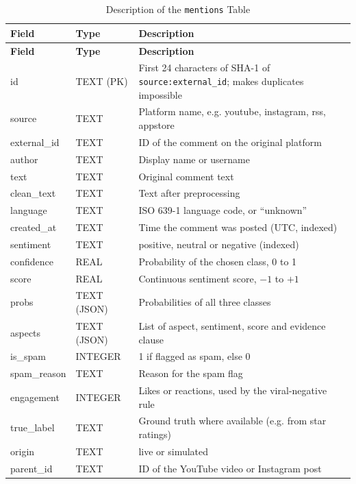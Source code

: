 \documentclass[12pt,a4paper]{report}
\begin{document}
\begin{longtable}{|P{2.8cm}|P{2.4cm}|P{8.6cm}|}
\caption{Description of the \texttt{mentions} Table}
\label{tab:mentions}\\
\hline
\textbf{Field} & \textbf{Type} & \textbf{Description} \\
\hline
\endfirsthead
\hline
\textbf{Field} & \textbf{Type} & \textbf{Description} \\
\hline
\endhead
id & TEXT (PK) & First 24 characters of SHA-1 of \texttt{source:external\_id}; makes duplicates impossible \\ \hline
source & TEXT & Platform name, e.g. youtube, instagram, rss, appstore \\ \hline
external\_id & TEXT & ID of the comment on the original platform \\ \hline
author & TEXT & Display name or username \\ \hline
text & TEXT & Original comment text \\ \hline
clean\_text & TEXT & Text after preprocessing \\ \hline
language & TEXT & ISO 639-1 language code, or ``unknown'' \\ \hline
created\_at & TEXT & Time the comment was posted (UTC, indexed) \\ \hline
sentiment & TEXT & positive, neutral or negative (indexed) \\ \hline
confidence & REAL & Probability of the chosen class, 0 to 1 \\ \hline
score & REAL & Continuous sentiment score, $-1$ to $+1$ \\ \hline
probs & TEXT (JSON) & Probabilities of all three classes \\ \hline
aspects & TEXT (JSON) & List of aspect, sentiment, score and evidence clause \\ \hline
is\_spam & INTEGER & 1 if flagged as spam, else 0 \\ \hline
spam\_reason & TEXT & Reason for the spam flag \\ \hline
engagement & INTEGER & Likes or reactions, used by the viral-negative rule \\ \hline
true\_label & TEXT & Ground truth where available (e.g. from star ratings) \\ \hline
origin & TEXT & live or simulated \\ \hline
parent\_id & TEXT & ID of the YouTube video or Instagram post \\ \hline
\end{longtable}
\end{document}
